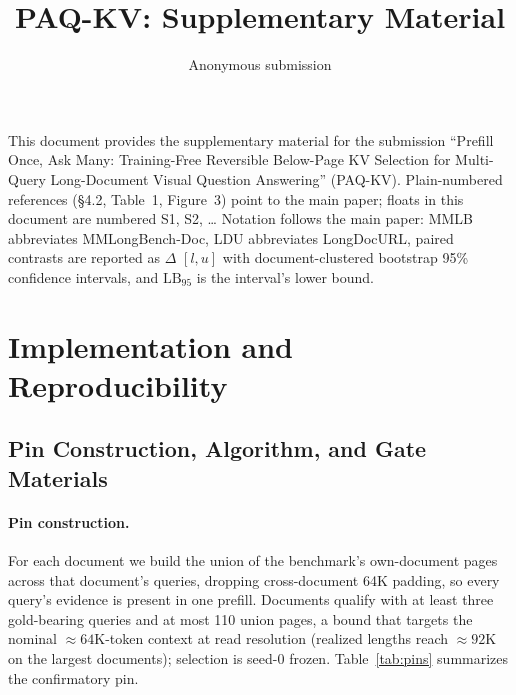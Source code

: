 \documentclass[letterpaper]{article} %
\title{PAQ-KV: Supplementary Material}
\author{
    Anonymous submission
}
\newcommand{\paqc}{\textsc{PAQ-KV}}
\newcommand{\lb}{\mathrm{LB}_{95}}
\begin{document}
\maketitle

\noindent This document provides the supplementary material for the
submission ``Prefill Once, Ask Many: Training-Free Reversible Below-Page KV
Selection for Multi-Query Long-Document Visual Question Answering''
(\paqc{}). Plain-numbered references (\S4.2, Table~1, Figure~3) point to
the main paper; floats in this document are numbered S1, S2, \ldots
Notation follows the main paper: MMLB abbreviates MMLongBench-Doc, LDU
abbreviates LongDocURL, paired contrasts are reported as $\Delta$ $[l,u]$
with document-clustered bootstrap 95\% confidence intervals, and $\lb$ is
the interval's lower bound.

\appendix



\section{Implementation and Reproducibility}\label{app:impl}

\subsection{Pin Construction, Algorithm, and Gate Materials}\label{app:method-materials}

\paragraph{Pin construction.} For each document we build the union of the
benchmark's own-document pages across that document's queries, dropping
cross-document 64K padding, so every query's evidence is present in one
prefill. Documents qualify with at least three gold-bearing queries and at
most 110 union pages, a bound that targets the nominal ${\approx}64$K-token
context at read resolution (realized lengths reach ${\approx}92$K on the
largest documents); selection is seed-0 frozen. Table~\ref{tab:pins}
summarizes the confirmatory pin.
\end{document}

